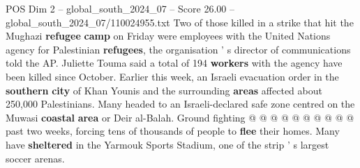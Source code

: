 \begin{textsample}{POS Dim 2 – global\_south\_2024\_07 – Score 26.00 – global\_south\_2024\_07/110024955.txt}
Two of those killed in a strike that hit the Mughazi \textbf{refugee} \textbf{camp} on Friday were employees with the United Nations agency for Palestinian \textbf{refugees}, the organisation ' s director of communications told the AP.
Juliette Touma said a total of 194 \textbf{workers} with the agency have been killed since October.
Earlier this week, an Israeli evacuation order in the \textbf{southern} \textbf{city} of Khan Younis and the surrounding \textbf{areas} affected about 250,000 Palestinians.
Many headed to an Israeli-declared safe zone centred on the Muwasi \textbf{coastal} \textbf{area} or Deir al-Balah.
Ground fighting @ @ @ @ @ @ @ @ @ @ past two weeks, forcing tens of thousands of people to \textbf{flee} their homes.
Many have \textbf{sheltered} in the Yarmouk Sports Stadium, one of the strip ' s largest soccer arenas.

\end{textsample}
